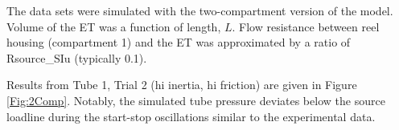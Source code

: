 \documentclass[letterpaper]{article}
\begin{document}
The data sets were simulated with the two-compartment version of the model.  Volume of the ET was
a function of length, $L$.  Flow resistance between reel housing (compartment 1) and
the ET was approximated by a ratio of Rsource\_SIu (typically 0.1).

Results from Tube 1, Trial 2 (hi inertia, hi friction) are given in Figure \ref{Fig:2Comp}.
Notably, the simulated tube pressure deviates below the source loadline during the start-stop
oscillations similar to the experimental data.

\end{document}

